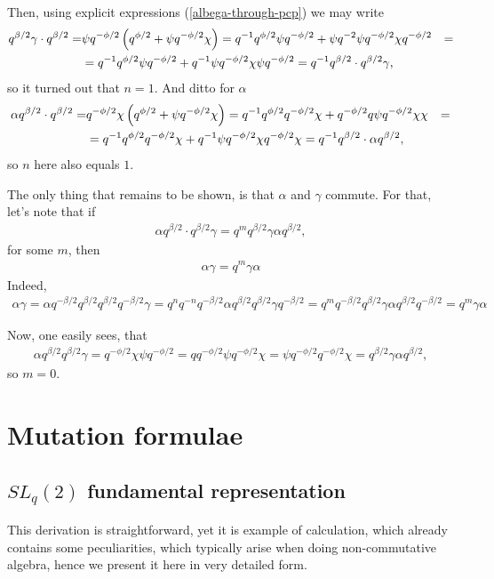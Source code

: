 \documentclass{article}
\newcommand{\be}{\begin{eqnarray}}
\newcommand{\ee}{\end{eqnarray}}
\newcommand {\?}{\textit{???}}
\newcommand{\delabel}[1]{(\ref{#1})}
\begin{document}
Then, using explicit expressions \delabel{albega-through-pcp} we may write
\be
q^{\beta/2} \gamma \cdot q^{\beta/2} = & \psi q^{-\phi/2} \qbHalf
= q^{-1} q^{\phi/2} \psi q^{-\phi/2} + \psi q^{-2} \psi q^{-\phi/2} \chi q^{-\phi/2} & = \\
& = q^{-1} q^{\phi/2} \psi q^{-\phi/2} + q^{-1} \psi q^{-\phi/2} \chi \psi q^{-\phi/2} = q^{-1} q^{\beta/2} \cdot q^{\beta/2} \gamma,
\ee
so it turned out that $n = 1$. And ditto for $\alpha$
\be
\alpha q^{\beta/2} \cdot q^{\beta/2} = & q^{-\phi/2} \chi \qbHalf
= q^{-1} q^{\phi/2} q^{-\phi/2} \chi + q^{-\phi/2} q \psi q^{-\phi/2} \chi \chi & = \\
& = q^{-1} q^{\phi/2} q^{-\phi/2} \chi + q^{-1} \psi q^{-\phi/2} \chi q^{-\phi/2} \chi
= q^{-1} q^{\beta/2} \cdot \alpha q^{\beta/2},
\ee
so $n$ here also equals $1$.

The only thing that remains to be shown, is that $\alpha$ and $\gamma$ commute.
For that, let's note that if
\be
\alpha q^{\beta/2} \cdot q^{\beta/2} \gamma = q^m q^{\beta/2} \gamma \alpha q^{\beta/2},
\ee
for some $m$, then
\be
\alpha \gamma = q^m \gamma \alpha
\ee
Indeed,
\be
\alpha \gamma = \alpha q^{-\beta/2} q^{\beta/2} q^{\beta/2} q^{-\beta/2} \gamma
= q^n q^{-n} q^{-\beta/2} \alpha q^{\beta/2} q^{\beta/2} \gamma q^{-\beta/2}
= q^m q^{-\beta/2} q^{\beta/2} \gamma \alpha q^{\beta/2} q^{-\beta/2} = q^m \gamma \alpha
\ee

Now, one easily sees, that
\be
\alpha q^{\beta/2} q^{\beta/2} \gamma = q^{-\phi/2} \chi \psi q^{-\phi/2} = q q^{-\phi/2} \psi q^{-\phi/2} \chi
= \psi q^{-\phi/2} q^{-\phi/2} \chi = q^{\beta/2} \gamma \alpha q^{\beta/2},
\ee
so $m = 0$.

\section{Mutation formulae}
\label{sec:mutation-formulae}
\subsection{$SL_q(2)$ fundamental representation}
\label{derivation-of-quantum-mutation-sl2}
This derivation is straightforward, yet it is example of calculation,
which already contains some peculiarities, which typically arise when doing non-commutative algebra,
hence we present it here in very detailed form.
\end{document}
